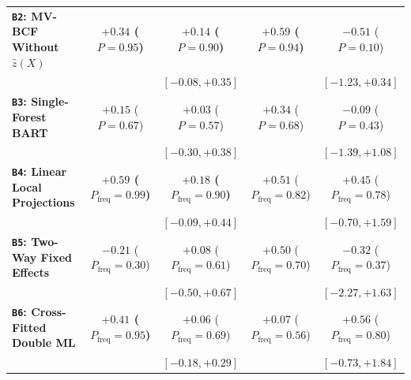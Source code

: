 \documentclass[11pt,a4paper]{article}
\newcommand{\co}{\cellcolor{colodd}}
\newcommand{\ce}{\cellcolor{coleven}}
\begin{document}
\begin{table}[htbp]
{\begin{tabular}{l|c|c|c|c}
    \hline
    \rowcolor{roweven}
    \textbf{\texttt{B2}: MV-BCF Without $\hat{z}(X)$} & \ce \textbf{$+0.34$ ($P=0.95$)} & \textbf{$+0.14$ ($P=0.90$)} & \ce \textbf{$+0.59$ ($P=0.94$)} & $-0.51$ ($P=0.10$) \\
    \rowcolor{roweven}
                                                                & \ce {\scriptsize $[-0.05, +0.73]$} & {\scriptsize $[-0.08, +0.35]$} & \ce {\scriptsize $[-0.11, +1.35]$} & {\scriptsize $[-1.23, +0.34]$} \\
    \hline
    \rowcolor{rowodd}
    \textbf{\texttt{B3}: Single-Forest BART} & \co $+0.15$ ($P=0.67$) & $+0.03$ ($P=0.57$) & \co $+0.34$ ($P=0.68$) & $-0.09$ ($P=0.43$) \\
    \rowcolor{rowodd}
                                                                & \co {\scriptsize $[-0.53, +0.85]$} & {\scriptsize $[-0.30, +0.38]$} & \co {\scriptsize $[-0.93, +1.62]$} & {\scriptsize $[-1.39, +1.08]$} \\
    \hline
    \rowcolor{roweven}
    \textbf{\texttt{B4}: Linear Local Projections} & \ce \textbf{$+0.59$ ($P_{\text{freq}}=0.99$)} & \textbf{$+0.18$ ($P_{\text{freq}}=0.90$)} & \ce $+0.51$ ($P_{\text{freq}}=0.82$) & $+0.45$ ($P_{\text{freq}}=0.78$) \\
    \rowcolor{roweven}
                                                                & \ce {\scriptsize $[+0.07, +1.12]$} & {\scriptsize $[-0.09, +0.44]$} & \ce {\scriptsize $[-0.58, +1.59]$} & {\scriptsize $[-0.70, +1.59]$} \\
    \hline
    \rowcolor{rowodd}
    \textbf{\texttt{B5}: Two-Way Fixed Effects} & \co $-0.21$ ($P_{\text{freq}}=0.30$) & $+0.08$ ($P_{\text{freq}}=0.61$) & \co $+0.50$ ($P_{\text{freq}}=0.70$) & $-0.32$ ($P_{\text{freq}}=0.37$) \\
    \rowcolor{rowodd}
                                                                & \co {\scriptsize $[-1.01, +0.59]$} & {\scriptsize $[-0.50, +0.67]$} & \co {\scriptsize $[-1.40, +2.41]$} & {\scriptsize $[-2.27, +1.63]$} \\
    \hline
    \rowcolor{roweven}
    \textbf{\texttt{B6}: Cross-Fitted Double ML} & \ce \textbf{$+0.41$ ($P_{\text{freq}}=0.95$)} & $+0.06$ ($P_{\text{freq}}=0.69$) & \ce $+0.07$ ($P_{\text{freq}}=0.56$) & $+0.56$ ($P_{\text{freq}}=0.80$) \\
    \rowcolor{roweven}
                                                                & \ce {\scriptsize $[-0.09, +0.91]$} & {\scriptsize $[-0.18, +0.29]$} & \ce {\scriptsize $[-0.94, +1.08]$} & {\scriptsize $[-0.73, +1.84]$} \\

\end{tabular}}
\end{table}
\end{document}
